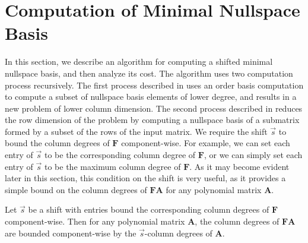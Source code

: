 
\section{Computation of Minimal Nullspace Basis}

\label{sec:Nullspace-Basis-Computation}

In this section, we describe an algorithm for computing a shifted
minimal nullspace basis, and then analyze its cost. The algorithm
uses two computation process recursively. The first process described
in  uses
an order basis computation to compute a subset of nullspace basis
elements of lower degree, and results in a new problem of lower column
dimension. The second process described in 
reduces the row dimension of the problem by computing a nullspace
basis of a submatrix formed by a subset of the rows of the input matrix.
We require the shift $\vec{s}$ to bound the column degrees of $\mathbf{F}$
component-wise. For example, we can set each entry of $\vec{s}$ to
be the corresponding column degree of $\mathbf{F}$, or we can simply
set each entry of $\vec{s}$ to be the maximum column degree of $\mathbf{F}$.
As it may become evident later in this section, this condition on
the shift is very useful, as it provides a simple bound on the column
degrees of $\mathbf{F}\mathbf{A}$ for any polynomial matrix $\mathbf{A}$.
\begin{lem}
\label{lem:boundOnDegreesOfFA}Let $\vec{s}$ be a shift with entries
bound the corresponding column degrees of $\mathbf{F}$ component-wise.
Then for any polynomial matrix $\mathbf{A}$, the column degrees of
$\mathbf{FA}$ are bounded component-wise by the $\vec{s}$-column
degrees of $\mathbf{A}$.
\end{lem}
\begin{comment}
In addition, it also provides a bound on the sum of the $\vec{s}$-column
degrees of $\vec{s}$-minimal nullspace bases as shown in \prettyref{lem:boundOfSumOfShiftedDegreesOfNullspaceBasis},
which uses an intermediate result on a bound of the sum of $\vec{s}$-column
degrees of order bases as shown in \prettyref{lem:boundOfSumOfShiftedDegreesOfOrderBasis}.
\end{comment}


